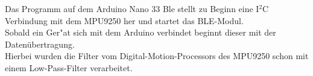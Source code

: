 Das Programm auf dem Arduino Nano 33 Ble stellt zu Beginn eine 
I$^2$C Verbindung mit dem MPU9250 her und startet das BLE-Modul.\\
Sobald ein Ger"at sich mit dem Arduino verbindet beginnt dieser
mit der Datenübertragung.\\
Hierbei wurden die Filter vom Digital-Motion-Processors des MPU9250 
schon mit einem Low-Pass-Filter verarbeitet. 